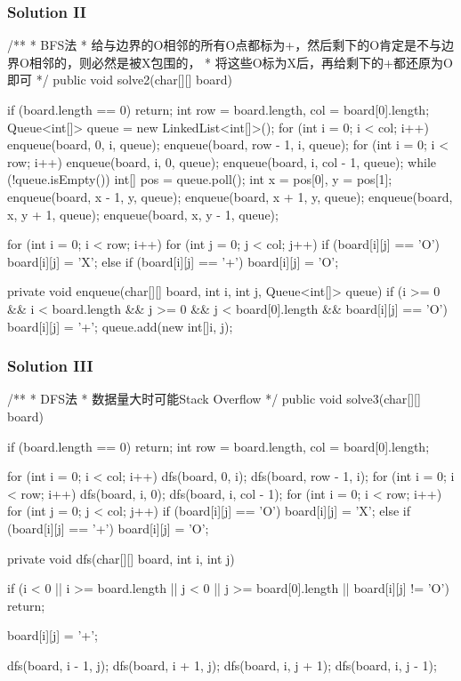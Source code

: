 \newpage

\subsubsection{Solution II}
\begin{Code}
/**
 * BFS法
 * 给与边界的O相邻的所有O点都标为+，然后剩下的O肯定是不与边界O相邻的，则必然是被X包围的，
 * 将这些O标为X后，再给剩下的+都还原为O即可
 */
public void solve2(char[][] board) {
    if (board.length == 0) {
        return;
    }
    int row = board.length, col = board[0].length;
    Queue<int[]> queue = new LinkedList<int[]>();
    for (int i = 0; i < col; i++) {
        enqueue(board, 0, i, queue);
        enqueue(board, row - 1, i, queue);
    }
    for (int i = 0; i < row; i++) {
        enqueue(board, i, 0, queue);
        enqueue(board, i, col - 1, queue);
    }
    while (!queue.isEmpty()) {
        int[] pos = queue.poll();
        int x = pos[0], y = pos[1];
        enqueue(board, x - 1, y, queue);
        enqueue(board, x + 1, y, queue);
        enqueue(board, x, y + 1, queue);
        enqueue(board, x, y - 1, queue);
    }

    for (int i = 0; i < row; i++) {
        for (int j = 0; j < col; j++) {
            if (board[i][j] == 'O') {
                board[i][j] = 'X';
            } else if (board[i][j] == '+') {
                board[i][j] = 'O';
            }
        }
    }
}

private void enqueue(char[][] board, int i, int j, Queue<int[]> queue) {
    if (i >= 0 && i < board.length && j >= 0 && j < board[0].length && board[i][j] == 'O') {
        board[i][j] = '+';
        queue.add(new int[]{i, j});
    }
}
\end{Code}

\newpage

\subsubsection{Solution III}

\begin{Code}
/**
 * DFS法
 * 数据量大时可能Stack Overflow
 */
public void solve3(char[][] board) {
    if (board.length == 0) {
        return;
    }
    int row = board.length, col = board[0].length;

    for (int i = 0; i < col; i++) {
        dfs(board, 0, i);
        dfs(board, row - 1, i);
    }
    for (int i = 0; i < row; i++) {
        dfs(board, i, 0);
        dfs(board, i, col - 1);
    }
    for (int i = 0; i < row; i++) {
        for (int j = 0; j < col; j++) {
            if (board[i][j] == 'O') {
                board[i][j] = 'X';
            } else if (board[i][j] == '+') {
                board[i][j] = 'O';
            }
        }
    }
}

private void dfs(char[][] board, int i, int j) {
    if (i < 0 || i >= board.length || j < 0 || j >= board[0].length || board[i][j] != 'O') {
        return;
    }

    board[i][j] = '+';

    dfs(board, i - 1, j);
    dfs(board, i + 1, j);
    dfs(board, i, j + 1);
    dfs(board, i, j - 1);
}
\end{Code}

